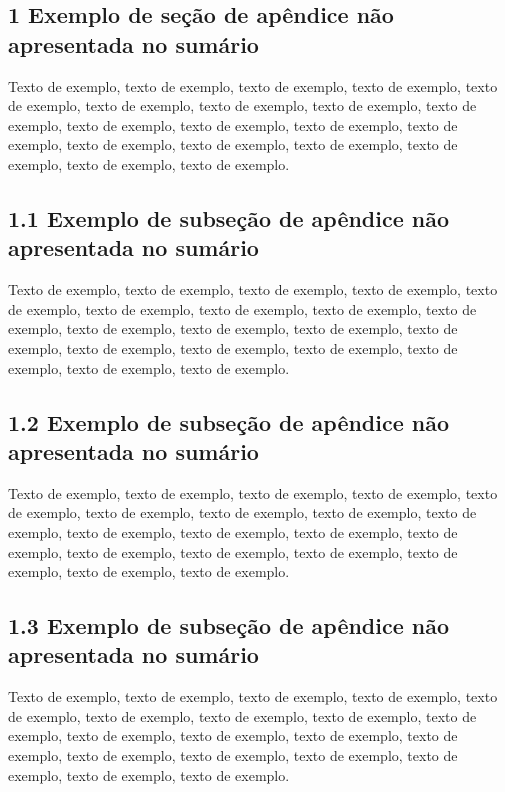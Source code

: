 \documentclass[
	12pt,				%
	oneside,			%
	a4paper,			%
	english,			%
	brazil				%
	]{abntex2ppgsi}
\begin{document}
\begin{apendicesenv}
\section*{1 Exemplo de seção de apêndice não apresentada no sumário}

Texto de exemplo, texto de exemplo, texto de exemplo, texto de exemplo, texto de exemplo, texto de exemplo, texto de exemplo, texto de exemplo, texto de exemplo, texto de exemplo, texto de exemplo, texto de exemplo, texto de exemplo, texto de exemplo, texto de exemplo, texto de exemplo, texto de exemplo, texto de exemplo, texto de exemplo.

\subsection*{1.1 Exemplo de subseção de apêndice não apresentada no sumário}

Texto de exemplo, texto de exemplo, texto de exemplo, texto de exemplo, texto de exemplo, texto de exemplo, texto de exemplo, texto de exemplo, texto de exemplo, texto de exemplo, texto de exemplo, texto de exemplo, texto de exemplo, texto de exemplo, texto de exemplo, texto de exemplo, texto de exemplo, texto de exemplo, texto de exemplo.

\subsection*{1.2 Exemplo de subseção de apêndice não apresentada no sumário}

Texto de exemplo, texto de exemplo, texto de exemplo, texto de exemplo, texto de exemplo, texto de exemplo, texto de exemplo, texto de exemplo, texto de exemplo, texto de exemplo, texto de exemplo, texto de exemplo, texto de exemplo, texto de exemplo, texto de exemplo, texto de exemplo, texto de exemplo, texto de exemplo, texto de exemplo.

\subsection*{1.3 Exemplo de subseção de apêndice não apresentada no sumário}

Texto de exemplo, texto de exemplo, texto de exemplo, texto de exemplo, texto de exemplo, texto de exemplo, texto de exemplo, texto de exemplo, texto de exemplo, texto de exemplo, texto de exemplo, texto de exemplo, texto de exemplo, texto de exemplo, texto de exemplo, texto de exemplo, texto de exemplo, texto de exemplo, texto de exemplo.


\end{apendicesenv}
\end{document}
